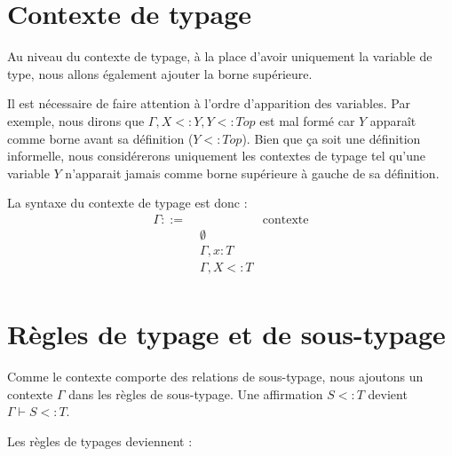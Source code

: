 \label{eval:system-f-sub}

\section{Contexte de typage}

Au niveau du contexte de typage, à la place d'avoir uniquement la variable de
type, nous allons également ajouter la borne supérieure.

Il est nécessaire de faire attention à l'ordre d'apparition des variables. Par
exemple, nous dirons que $\Gamma, X <: Y, Y <: Top$ est mal formé car $Y$
apparaît comme borne avant sa définition ($Y <: Top$). Bien que ça soit une
définition informelle, nous considérerons uniquement les contextes de typage
tel qu'une variable $Y$ n'apparait jamais comme borne supérieure à gauche de sa
définition.

La syntaxe du contexte de typage est donc :
\begin{align*}
  \Gamma ::= & \, & \text{contexte} \\
        & \; \emptyset & \\
        & \; \Gamma, x : T & \\
        & \; \Gamma, X <: T & \\
\end{align*}

\section{Règles de typage et de sous-typage}

Comme le contexte comporte des relations de sous-typage, nous ajoutons un
contexte $\Gamma$ dans les règles de sous-typage. Une affirmation $S <: T$
devient $\Gamma \vdash S <: T$.

Les règles de typages deviennent :

